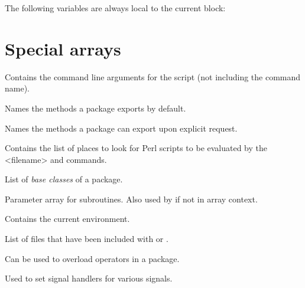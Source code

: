 \documentclass{refbase}
\begin{document}
The following variables are always local to the current block:





\section{Special arrays} 

\begin{enum}{1.5cm}

Contains the command line arguments for the script (not including the command name).

Names the methods a package exports by default.

Names the methods a package can export upon explicit request.

Contains the list of places to look for Perl scripts to be evaluated
by the  <filename> and  commands. 

List of \textit{base classes} of a package.

Parameter array for subroutines. Also used by  if not in
array context. 

Contains the current environment.

List of files that have been included with  or .

Can be used to overload operators in a package.

Used to set signal handlers for various signals.

\end{enum}
\end{document}
